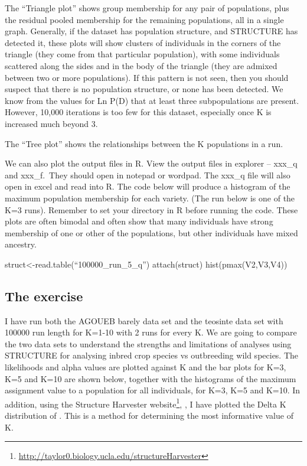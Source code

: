 \documentclass[
]{book}
\newenvironment{Shaded}{\begin{snugshade}}{\end{snugshade}}
\newcommand{\FunctionTok}[1]{\textcolor[rgb]{0.00,0.00,0.00}{#1}}
\newcommand{\NormalTok}[1]{#1}
\newcommand{\OtherTok}[1]{\textcolor[rgb]{0.56,0.35,0.01}{#1}}
\renewcommand{\href}[2]{#2\footnote{\url{#1}}}
\begin{document}
The ``Triangle plot'' shows group membership for any pair of populations, plus the residual pooled membership for the remaining populations, all in a single graph. Generally, if the dataset has population structure, and STRUCTURE has detected it, these plots will show clusters of individuals in the corners of the triangle (they come from that particular population), with some individuals scattered along the sides and in the body of the triangle (they are admixed between two or more populations). If this pattern is not seen, then you should suspect that there is no population structure, or none has been detected. We know from the values for Ln P(D) that at least three subpopulations are present. However, 10,000 iterations is too few for this dataset, especially once K is increased much beyond 3.

The ``Tree plot'' shows the relationships between the K populations in a run.

We can also plot the output files in R. View the output files in explorer -- xxx\_q and xxx\_f.~They should open in notepad or wordpad. The xxx\_q file will also open in excel and read into R. The code below will produce a histogram of the maximum population membership for each variety. (The run below is one of the K=3 runs). Remember to set your directory in R before running the code. These plots are often bimodal and often show that many individuals have strong membership of one or other of the populations, but other individuals have mixed ancestry.

\begin{Shaded}
\begin{Highlighting}[]
\NormalTok{struct}\OtherTok{\textless{}{-}}\FunctionTok{read.table}\NormalTok{(“100000\_run\_5\_q”)}
\FunctionTok{attach}\NormalTok{(struct)}
\FunctionTok{hist}\NormalTok{(}\FunctionTok{pmax}\NormalTok{(V2,V3,V4))}
\end{Highlighting}
\end{Shaded}

\hypertarget{the-exercise}{%
\subsection{The exercise}\label{the-exercise}}

I have run both the AGOUEB barely data set and the teosinte data set with 100000 run length for K=1-10 with 2 runs for every K. We are going to compare the two data sets to understand the strengths and limitations of analyses using STRUCTURE for analysing inbred crop species vs outbreeding wild species. The likelihoods and alpha values are plotted against K and the bar plots for K=3, K=5 and K=10 are shown below, together with the histograms of the maximum assignment value to a population for all individuals, for K=3, K=5 and K=10. In addition, using the \href{http://taylor0.biology.ucla.edu/structureHarvester}{Structure Harvester website}, \citet{STRUCTURE2012}, I have plotted the Delta K distribution of \citet{Evanno2005}. This is a method for determining the most informative value of K.
\end{document}
